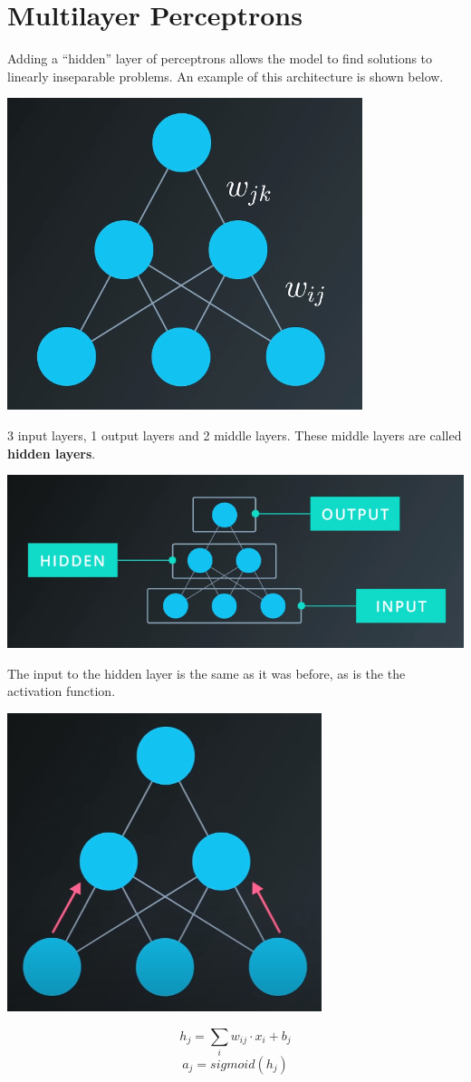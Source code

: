 \section{Multilayer Perceptrons}

Adding a “hidden” layer of perceptrons allows the model to find solutions to linearly inseparable problems. An example of this architecture is shown below.

\includegraphics[width=0.5\linewidth]{img//intro//multilayer-perceptrons-1.png}

3 input layers, 1 output layers and 2 middle layers. These middle layers are called \textbf{hidden layers}.

\includegraphics[width=0.5\linewidth]{img//intro//multilayer-perceptrons-2.png}

The input to the hidden layer is the same as it was before, as is the the activation function.

\includegraphics[width=0.5\linewidth]{img//intro//multilayer-perceptrons-3.png}

\[h_j = \sum_i w_{ij} \cdot x_i + b_j\]
\[a_j = sigmoid(h_j)\]

